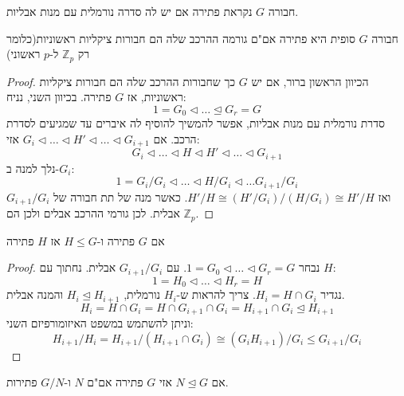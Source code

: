\documentclass{tstextbook}
\begin{document}
\begin{definition}[פתירות]
חבורה \(G\) נקראת פתירה אם יש לה סדרה נורמלית עם מנות אבליות.

\end{definition}
\begin{proposition}
חבורה \(G\) סופית היא פתירה אם"ם גורמה ההרכב שלה הם חבורות ציקליות
ראשוניות(כלומר רק \(\mathbb{Z} _p\) ל-\(p\) ראשוני)

\end{proposition}
\begin{proof}
הכיוון הראשון ברור, אם יש \(G\) כך שחבורות ההרכב שלה הם חבורות
ציקליות ראשוניות, אז \(G\) פתירה. בכיוון השני, נניח:
$$1=G_{0}\triangleleft \dots \trianglelefteq G_{r}=G$$
סדרת נורמלית עם מנות אבליות, אפשר להמשיך להוסיף לה איברים עד שמגיעים לסדרת הרכב. אם \(G_{i}\triangleleft \dots \triangleleft H'\triangleleft \dots \triangleleft G_{i+1}\) אזי:
$$G_{i}\triangleleft \dots \triangleleft H\triangleleft H'\triangleleft \dots \triangleleft G_{i+1}$$
נלך למנה ב-\(G_{i}\):
$$1=G_{i} / G_{i} \triangleleft \dots \triangleleft H / G_{i}\triangleleft \dots G_{i+1} / G_{i}$$
ואז \(H' / H \cong (H' / G_{i}) / (H / G_{i})\cong H' / H\). כאשר מנה של תת חבורה של \(G_{i+1} / G_{i}\) אבלית. לכן גורמי ההרכב אבלים ולכן הם \(\mathbb{Z} _p\).

\end{proof}
\begin{proposition}
אם \(G\) פתירה ו-\(H\leq G\) אז \(H\) פתירה

\end{proposition}
\begin{proof}
נבחר \(1=G_{0}\triangleleft \dots \triangleleft G_{r} = G\). עם \(G_{i+1} / G_{i}\) אבלית. נחתוך עם \(H\):
$$1=H_{0}\triangleleft \dots \triangleleft H_{r}=H$$
נגדיר \(H_{i}=H\cap G_{i}\). צריך להראות ש-\(H_{i}\) נורמלית, \(H_{i}\trianglelefteq H_{i+1}\) והמנה אבלית.
$$H_{i}=H\cap G_{i}=H\cap G_{i+1}\cap G_{i}=H_{i+1}\cap G_{i}\trianglelefteq H_{i+1}$$
וניתן להשתמש במשפט האיזומורפיזם השני:
$$H_{i+1} / H_{i} = H_{i+1} / \left( H_{i+1}\cap G_{i} \right)\cong (G_{i} H_{i+1}) / G_{i} \leq G_{i+1} / G_{i}$$

\end{proof}
\begin{proposition}
אם \(N\trianglelefteq G\) אזי \(G\) פתירה אם"ם \(N\) ו-\(G / N\) פתירות.

\end{proposition}
\end{document}
